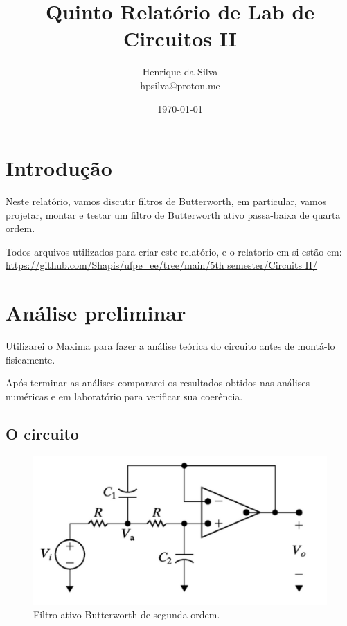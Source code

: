 \documentclass[12pt,twoside, a4paper, twocolumn]{article}
\title{Quinto Relatório de Lab de Circuitos II}
\author{Henrique da Silva \\ hpsilva@proton.me}
\date{\today}
\begin{document}
\maketitle
{}
\newpage
\tableofcontents
\newpage




\section{Introdução}


Neste relatório, vamos discutir filtros de Butterworth, em particular, vamos projetar, montar e testar um filtro de Butterworth ativo passa-baixa de quarta ordem.


Todos arquivos utilizados para criar este relatório, e o relatorio em si estão em:  \url{https://github.com/Shapis/ufpe_ee/tree/main/5th semester/Circuits II/}


\section{Análise preliminar}


Utilizarei o Maxima para fazer a análise teórica do circuito antes de montá-lo fisicamente.


Após terminar as análises compararei os resultados obtidos nas análises numéricas e em laboratório para verificar sua coerência.


\subsection{O circuito}


\begin{figure}[h]
    \centering
    \includegraphics[width=1\columnwidth]{images/circuito.png}
    \caption{Filtro ativo Butterworth de segunda ordem.}
\end{figure}
\end{document}
